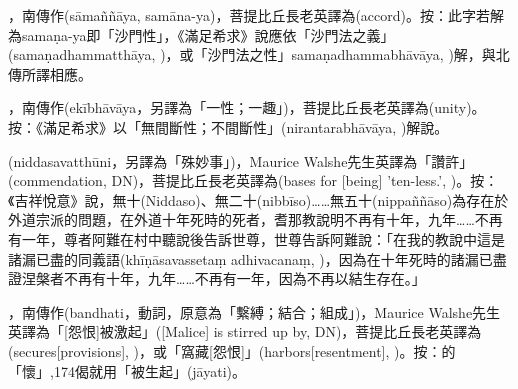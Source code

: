 \startitemgroup[noteitems]
\item{}，南傳作(sāmaññāya, samāna-ya)，菩提比丘長老英譯為(accord)。按：此字若解為samaṇa-ya即「沙門性」，《滿足希求》說應依「沙門法之義」(samaṇadhammatthāya, )，或「沙門法之性」samaṇadhammabhāvāya, )解，與北傳所譯相應。
\item{}，南傳作(ekībhāvāya，另譯為「一性；一趣」)，菩提比丘長老英譯為(unity)。按：《滿足希求》以「無間斷性；不間斷性」(nirantarabhāvāya, )解說。
\stopitemgroup

\startitemgroup[noteitems]
\item{}(niddasavatthūni，另譯為「殊妙事」)，Maurice Walshe先生英譯為「讚許」(commendation, DN)，菩提比丘長老英譯為(bases for [being] 'ten-less.', )。按：《吉祥悅意》說，無十(Niddaso)、無二十(nibbīso)……無五十(nippaññāso)為存在於外道宗派的問題，在外道十年死時的死者，耆那教說明不再有十年，九年……不再有一年，尊者阿難在村中聽說後告訴世尊，世尊告訴阿難說：「在我的教說中這是諸漏已盡的同義語(khīṇāsavassetaṃ adhivacanaṃ, )，因為在十年死時的諸漏已盡證涅槃者不再有十年，九年……不再有一年，因為不再以結生存在。」
\stopitemgroup

\startitemgroup[noteitems]
\item{}，南傳作(bandhati，動詞，原意為「繫縛；結合；組成」)，Maurice Walshe先生英譯為「[怨恨]被激起」([Malice] is stirred up by, DN)，菩提比丘長老英譯為(secures[provisions], )，或「窩藏[怨恨]」(harbors[resentment], )。按：的「懷」,174偈就用「被生起」(jāyati)。
\stopitemgroup

